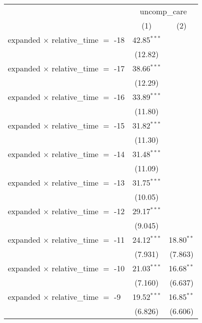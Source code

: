 
\begingroup
\centering
\begin{tabular}{lcc}
   \toprule
    & \multicolumn{2}{c}{uncomp\_care}\\
                                              & (1)            & (2)\\  
   \midrule 
   expanded $\times$ relative\_time $=$ -18   & 42.85$^{***}$  &   \\   
                                              & (12.82)        &   \\   
   expanded $\times$ relative\_time $=$ -17   & 38.66$^{***}$  &   \\   
                                              & (12.29)        &   \\   
   expanded $\times$ relative\_time $=$ -16   & 33.89$^{***}$  &   \\   
                                              & (11.80)        &   \\   
   expanded $\times$ relative\_time $=$ -15   & 31.82$^{***}$  &   \\   
                                              & (11.30)        &   \\   
   expanded $\times$ relative\_time $=$ -14   & 31.48$^{***}$  &   \\   
                                              & (11.09)        &   \\   
   expanded $\times$ relative\_time $=$ -13   & 31.75$^{***}$  &   \\   
                                              & (10.05)        &   \\   
   expanded $\times$ relative\_time $=$ -12   & 29.17$^{***}$  &   \\   
                                              & (9.045)        &   \\   
   expanded $\times$ relative\_time $=$ -11   & 24.12$^{***}$  & 18.80$^{**}$\\   
                                              & (7.931)        & (7.863)\\   
   expanded $\times$ relative\_time $=$ -10   & 21.03$^{***}$  & 16.68$^{**}$\\   
                                              & (7.160)        & (6.637)\\   
   expanded $\times$ relative\_time $=$ -9    & 19.52$^{***}$  & 16.85$^{**}$\\   
                                              & (6.826)        & (6.606)\\   

\end{tabular}
